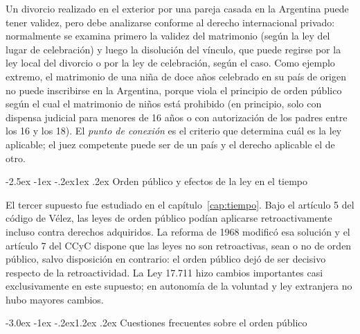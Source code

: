 \documentclass[12pt,oneside]{book}
\makeatletter
\renewcommand\section{\@startsection{section}{1}{\z@}%
  {-3.0ex \@plus -1ex \@minus -.2ex}{1.2ex \@plus .2ex}%
  {\normalfont\large\bfseries\color{acento}}}
\renewcommand\subsection{\@startsection{subsection}{2}{\z@}%
  {-2.5ex \@plus -1ex \@minus -.2ex}{1ex \@plus .2ex}%
  {\normalfont\normalsize\bfseries}}
\makeatother
\begin{document}
\begin{nota}
Un divorcio realizado en el exterior por una pareja casada en la Argentina puede tener validez, pero debe analizarse conforme al derecho internacional privado: normalmente se examina primero la validez del matrimonio (según la ley del lugar de celebración) y luego la disolución del vínculo, que puede regirse por la ley local del divorcio o por la ley de celebración, según el caso. Como ejemplo extremo, el matrimonio de una niña de doce años celebrado en su país de origen no puede inscribirse en la Argentina, porque viola el principio de orden público según el cual el matrimonio de niños está prohibido (en principio, solo con dispensa judicial para menores de 16 años o con autorización de los padres entre los 16 y los 18). El \textit{punto de conexión} es el criterio que determina cuál es la ley aplicable; el juez competente puede ser de un país y el derecho aplicable el de otro.
\end{nota}

\subsection{Orden público y efectos de la ley en el tiempo}

El tercer supuesto fue estudiado en el capítulo~\ref{cap:tiempo}. Bajo el artículo 5 del código de Vélez, las leyes de orden público podían aplicarse retroactivamente incluso contra derechos adquiridos. La reforma de 1968 modificó esa solución y el artículo 7 del CCyC dispone que las leyes no son retroactivas, sean o no de orden público, salvo disposición en contrario: el orden público dejó de ser decisivo respecto de la retroactividad. La Ley 17.711 hizo cambios importantes casi exclusivamente en este supuesto; en autonomía de la voluntad y ley extranjera no hubo mayores cambios.

\section{Cuestiones frecuentes sobre el orden público}
\end{document}
